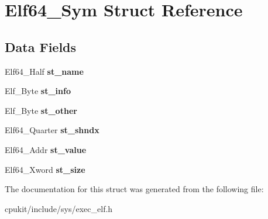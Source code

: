 \hypertarget{structElf64__Sym}{}\section{Elf64\+\_\+\+Sym Struct Reference}
\label{structElf64__Sym}
\subsection*{Data Fields}
\begin{DoxyCompactItemize}
\item 
\mbox{\label{structElf64__Sym_a4ab57ed14cec2fd62166a5286b730bba}} 
Elf64\+\_\+\+Half {\bfseries st\+\_\+name}
\item 
\mbox{\label{structElf64__Sym_a95866054dfa48ec98c569fff68f5505d}} 
Elf\+\_\+\+Byte {\bfseries st\+\_\+info}
\item 
\mbox{\label{structElf64__Sym_a1d01b0e6c064e7f2b5acc6d2da11f52a}} 
Elf\+\_\+\+Byte {\bfseries st\+\_\+other}
\item 
\mbox{\label{structElf64__Sym_a030c67483fb4f1d1bfb3cb0eaf895461}} 
Elf64\+\_\+\+Quarter {\bfseries st\+\_\+shndx}
\item 
\mbox{\label{structElf64__Sym_a9601295da4c2e81cc18c1f777609e1bf}} 
Elf64\+\_\+\+Addr {\bfseries st\+\_\+value}
\item 
\mbox{\label{structElf64__Sym_af5c72e0a09802b81e8087b303ec4d29f}} 
Elf64\+\_\+\+Xword {\bfseries st\+\_\+size}
\end{DoxyCompactItemize}


The documentation for this struct was generated from the following file\+:\begin{DoxyCompactItemize}
\item 
cpukit/include/sys/exec\+\_\+elf.\+h\end{DoxyCompactItemize}
